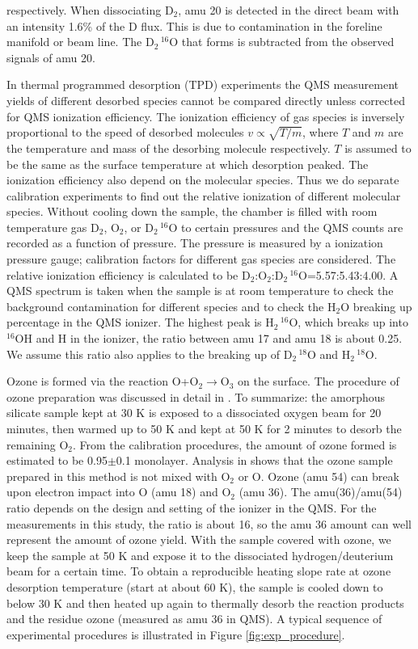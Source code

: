 \documentclass[iop]{emulateapj}
\begin{document}
respectively. When dissociating D$_2$, amu 20 is detected in the direct beam with an intensity 1.6\% of the D flux.  This is due to contamination in the foreline manifold or beam line. The D$_2\,^{16}$O that forms is subtracted from the observed signals of amu 20. 

In thermal programmed desorption (TPD) experiments the QMS measurement yields of different desorbed species cannot be compared directly unless corrected for QMS ionization efficiency. The ionization efficiency of gas species is inversely proportional to the speed of desorbed molecules $v\propto \sqrt{T/m}$, where $T$ and $m$ are the temperature and mass of the desorbing molecule respectively. $T$ is assumed to be the same as the surface temperature at which desorption peaked. The ionization efficiency also depend on the molecular species. Thus we do separate calibration experiments to find out the relative ionization of different molecular species. Without cooling down the sample, the chamber is filled with room temperature gas D$_2$, O$_2$, or D$_2\,^{16}$O to certain pressures and the QMS counts are recorded as a function of pressure. The pressure is measured by a ionization pressure gauge; calibration factors for different gas species are considered. The relative ionization efficiency is calculated to be D$_2$:O$_2$:D$_2\,^{16}$O=5.57:5.43:4.00. A QMS spectrum is taken when the sample is at room temperature to check the background contamination for different species and to check the H$_2$O breaking up percentage in the QMS ionizer. The highest peak is H$_2\,^{16}$O, which breaks up into $^{16}$OH and H in the ionizer, the ratio between amu 17 and amu 18 is about 0.25. We assume this ratio also applies to the breaking up of D$_2\,^{18}$O and H$_2\,^{18}$O. 

Ozone is formed via the reaction O+O$_2\rightarrow$O$_3$ on the surface. The procedure of ozone preparation was discussed in detail in \citet{He2014}. To summarize: the amorphous silicate sample kept at 30 K is exposed to a dissociated oxygen beam for 20 minutes, then warmed up to 50 K and kept at 50 K for 2 minutes to desorb the remaining O$_2$. From the calibration procedures, the amount of ozone formed is estimated to be 0.95$\pm$0.1 monolayer. Analysis in \citet{He2014} shows that the ozone sample prepared in this method is not mixed with O$_2$ or O. Ozone (amu 54) can break upon electron impact into O (amu 18) and O$_2$ (amu 36). The amu(36)/amu(54) ratio depends on the design and setting of the ionizer in the QMS. For the measurements in this study, the ratio is about 16, so the amu 36 amount can well represent the amount of ozone yield. With the sample covered with ozone, we keep the sample at 50 K and expose it to the dissociated hydrogen/deuterium beam for a certain time. To obtain a reproducible heating slope rate at ozone desorption temperature (start at about 60 K), the sample is cooled down to below 30 K and then heated up again to thermally desorb the reaction products and the residue ozone (measured as amu 36 in QMS). A typical sequence of experimental procedures is illustrated in Figure \ref{fig:exp_procedure}. 
\end{document}
